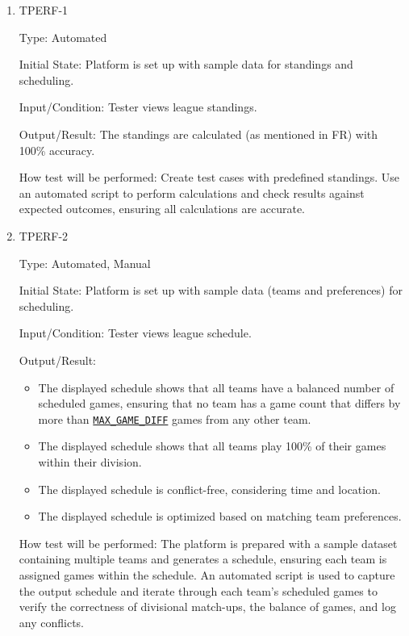 \documentclass[12pt, titlepage]{article}
\begin{document}
\begin{enumerate}

  \item{TPERF-1\\}

        Type: Automated

        Initial State: Platform is set up with sample data for standings and scheduling.

        Input/Condition: Tester views league standings.

        Output/Result: The standings are calculated (as mentioned in FR) with 100\% accuracy.

        How test will be performed: Create test cases with predefined standings. Use an automated script to perform calculations and check results against expected outcomes, ensuring all calculations are accurate.

  \item{TPERF-2\\}

        Type: Automated, Manual

        Initial State: Platform is set up with sample data (teams and preferences) for scheduling.

        Input/Condition: Tester views league schedule.

        Output/Result:
        \begin{itemize}
          \item{The displayed schedule shows that all teams have a balanced number of scheduled games, ensuring that no team has a game count that differs by more than \hyperref[MAX_GAME_DIFF]{\texttt{MAX\_GAME\_DIFF}} games from any other team.}
          \item{The displayed schedule shows that all teams play 100\% of their games within their division.}
          \item{The displayed schedule is conflict-free, considering time and location.}
          \item{The displayed schedule is optimized based on matching team preferences.}
        \end{itemize}

        How test will be performed:  The platform is prepared with a sample dataset containing multiple teams and generates a schedule, ensuring each team is assigned games within the schedule. An automated script is used to capture the output schedule and iterate through each team's scheduled games to verify the correctness of divisional match-ups, the balance of games, and log any conflicts.


\end{enumerate}
\end{document}
